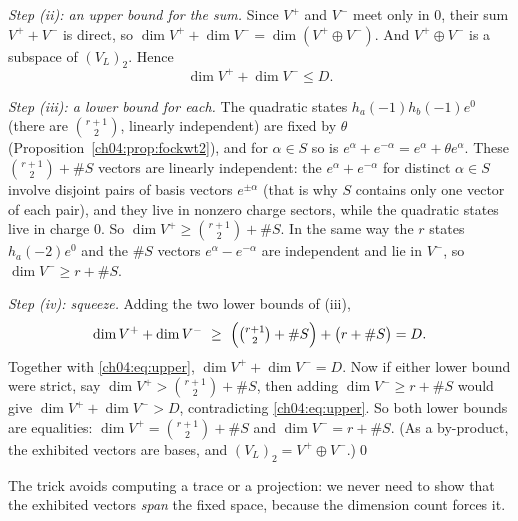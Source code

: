 \emph{Step (ii): an upper bound for the sum.} Since $V^+$ and $V^-$ meet only in $0$, their sum
$V^++V^-$ is direct, so $\dim V^++\dim V^-=\dim(V^+\oplus V^-)$. And $V^+\oplus V^-$ is a subspace of
$(V_L)_2$. Hence
\begin{equation}\label{ch04:eq:upper}
  \dim V^++\dim V^-\le D .
\end{equation}

\emph{Step (iii): a lower bound for each.} The quadratic states $h_a(-1)h_b(-1)e^0$ (there are
$\binom{r+1}2$, linearly independent) are fixed by $\theta$ (Proposition~\ref{ch04:prop:fockwt2}), and
for $\alpha\in S$ so is $e^\alpha+e^{-\alpha}=e^\alpha+\theta e^\alpha$. These $\binom{r+1}2+\#S$ vectors are
linearly independent: the $e^\alpha+e^{-\alpha}$ for distinct $\alpha\in S$ involve disjoint pairs of basis
vectors $e^{\pm\alpha}$ (that is why $S$ contains only one vector of each pair), and they live in
nonzero charge sectors, while the quadratic states live in charge $0$. So
$\dim V^+\ge\binom{r+1}2+\#S$. In the same way the $r$ states $h_a(-2)e^0$ and the $\#S$ vectors
$e^\alpha-e^{-\alpha}$ are independent and lie in $V^-$, so $\dim V^-\ge r+\#S$.

\emph{Step (iv): squeeze.} Adding the two lower bounds of (iii),
\begin{equation*}
  \dim V^++\dim V^-\ \ge\ \Big(\tbinom{r+1}2+\#S\Big)+\big(r+\#S\big)=D .
\end{equation*}
Together with \eqref{ch04:eq:upper}, $\dim V^++\dim V^-=D$. Now if either lower bound were strict,
say $\dim V^+>\binom{r+1}2+\#S$, then adding $\dim V^-\ge r+\#S$ would give
$\dim V^++\dim V^->D$, contradicting \eqref{ch04:eq:upper}. So both lower bounds are equalities:
$\dim V^+=\binom{r+1}2+\#S$ and $\dim V^-=r+\#S$. (As a by-product, the exhibited vectors are bases,
and $(V_L)_2=V^+\oplus V^-$.)\qed

The trick avoids computing a trace or a projection: we never need to show that the exhibited
vectors \emph{span} the fixed space, because the dimension count forces it.

